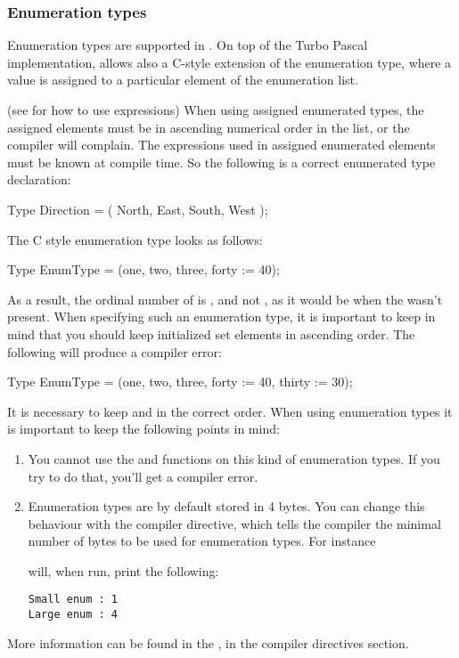 \documentclass{report}
\begin{document}
\subsubsection{Enumeration types}
Enumeration types are supported in \fpc. On top of the Turbo Pascal
implementation, \fpc allows also a C-style extension of the
enumeration type, where a value is assigned to a particular element of
the enumeration list.

(see  for how to use expressions)
When using assigned enumerated types, the assigned elements must be in
ascending numerical order in the list, or the compiler will complain.
The expressions used in assigned enumerated elements must be known at
compile time.
So the following is a correct enumerated type declaration:
\begin{listing}
Type
  Direction = ( North, East, South, West );
\end{listing}
The C style enumeration type looks as follows:
\begin{listing}
Type
  EnumType = (one, two, three, forty := 40);
\end{listing}
As a result, the ordinal number of  is , and not ,
as it would be when the  wasn't present.
When specifying such an enumeration type, it is important to keep in mind
that you should keep initialized set elements in ascending order. The
following will produce a compiler error:
\renewcommand{\prelisting}{\sffamily}
\begin{listing}
Type
  EnumType = (one, two, three, forty := 40, thirty := 30);
\end{listing}
It is necessary to keep  and  in the correct order.
When using enumeration types it is important to keep the following points 
in mind:
\begin{enumerate}
\item You cannot use the  and  functions on
this kind of enumeration types. If you try to do that, you'll get a compiler
error.
\item Enumeration types are by default stored in 4 bytes. You can change
this behaviour with the  compiler directive, which
tells the compiler the minimal number of bytes to be used for enumeration
types.
For instance
will, when run, print the following: 
\begin{verbatim}
Small enum : 1
Large enum : 4
\end{verbatim}
\end{enumerate}
More information can be found in the \progref, in the compiler directives
section.
\end{document}
